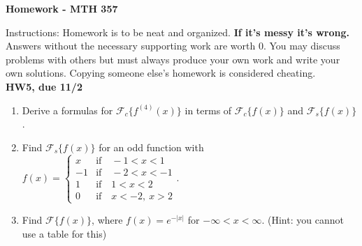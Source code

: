 \documentclass[10pt]{article}
\begin{document}
\begin{center}
{\Large\bf  Homework - MTH 357}\\
\vspace{.1in}

\end{center}

\noindent Instructions:
Homework is to be neat and organized.  \textbf{If it's messy it's wrong.} Answers without the necessary supporting work are worth 0.   You may discuss problems with others but must always produce your own work and write your own solutions.  Copying someone else's homework is considered cheating.\\


\noindent \textbf{HW5, due 11/2}
\begin{enumerate}
\item Derive a formulas for $\mathscr{F}_c\{f^{(4)}(x)\}$ in terms of $\mathscr{F}_c\{f(x)\}$ and $\mathscr{F}_s\{f(x)\}$.
\item  Find $\mathscr{F}_s\{f(x)\}$ for an odd function with $f(x)=\left\{\begin{array}{ll}
x & \mbox{if} \quad -1 < x < 1\\
-1 & \mbox{if} \quad -2 < x < -1\\
1 & \mbox{if} \quad 1 < x < 2\\
0 & \mbox{if} \quad x < -2, \ x > 2
\end{array}
\right. $.  \\
\item Find $\mathscr{F}\{f(x)\}$, where $f(x)=e^{-|x|}$ for $-\infty<x<\infty$. (Hint: you cannot use a table for this)
\end{enumerate}
\end{document}
